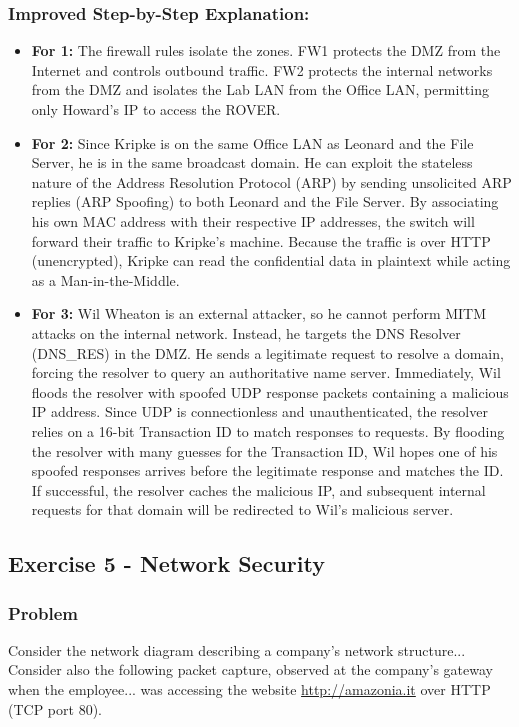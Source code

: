 \documentclass{article}
\begin{document}
\subsubsection*{Improved Step-by-Step Explanation:}
\begin{itemize}
    \item \textbf{For 1:} The firewall rules isolate the zones. FW1 protects the DMZ from the Internet and controls outbound traffic. FW2 protects the internal networks from the DMZ and isolates the Lab LAN from the Office LAN, permitting only Howard's IP to access the ROVER.
    \item \textbf{For 2:} Since Kripke is on the same Office LAN as Leonard and the File Server, he is in the same broadcast domain. He can exploit the stateless nature of the Address Resolution Protocol (ARP) by sending unsolicited ARP replies (ARP Spoofing) to both Leonard and the File Server. By associating his own MAC address with their respective IP addresses, the switch will forward their traffic to Kripke's machine. Because the traffic is over HTTP (unencrypted), Kripke can read the confidential data in plaintext while acting as a Man-in-the-Middle.
    \item \textbf{For 3:} Wil Wheaton is an external attacker, so he cannot perform MITM attacks on the internal network. Instead, he targets the DNS Resolver (DNS\_RES) in the DMZ. He sends a legitimate request to resolve a domain, forcing the resolver to query an authoritative name server. Immediately, Wil floods the resolver with spoofed UDP response packets containing a malicious IP address. Since UDP is connectionless and unauthenticated, the resolver relies on a 16-bit Transaction ID to match responses to requests. By flooding the resolver with many guesses for the Transaction ID, Wil hopes one of his spoofed responses arrives before the legitimate response and matches the ID. If successful, the resolver caches the malicious IP, and subsequent internal requests for that domain will be redirected to Wil's malicious server.
\end{itemize}

\subsection{Exercise 5 - Network Security}
\subsubsection*{Problem}
Consider the network diagram describing a company's network structure...
Consider also the following packet capture, observed at the company's gateway when the employee... was accessing the website \url{http://amazonia.it} over HTTP (TCP port 80).
\end{document}
